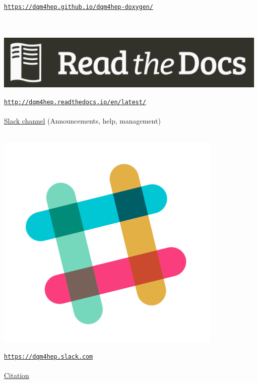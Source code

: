 \documentclass[presentation, 10pt]{beamer}
\begin{document}
\begin{frame}
  \href{https://dqm4hep.github.io/dqm4hep-doxygen/}{\tt https://dqm4hep.github.io/dqm4hep-doxygen/} \\
  ~\\
  ~~~
  \begin{minipage}{0.1\linewidth}
    \includegraphics[width=\linewidth]{figs/readthedocs-logo.png}
  \end{minipage}
  \href{http://dqm4hep.readthedocs.io/en/latest/}{\tt http://dqm4hep.readthedocs.io/en/latest/} \\
  ~\\
  \underline{Slack channel} (Announcements, help, management) \\
  \vspace*{0.1cm}
  ~~~
  \begin{minipage}{0.035\linewidth}
    \includegraphics[width=\linewidth]{figs/slack-logo.png}
  \end{minipage}
  \href{https://dqm4hep.slack.com}{\tt https://dqm4hep.slack.com} \\
  ~\\
  \underline{Citation} \\

\end{frame}
\end{document}
